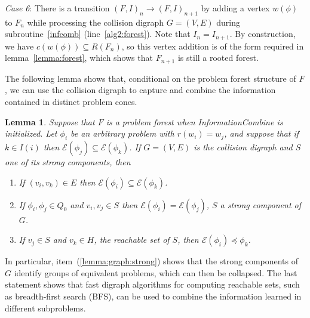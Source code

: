 \documentclass[11pt,reqno]{amsart}
\newtheorem{lemma}[thm]{Lemma}
\theoremstyle{definition}
\numberwithin{equation}{section}
\newcommand{\pre}{\phi}
\newcommand{\sub}{\subseteq}
\newcommand{\fix}{\mathcal{E}}
\newcommand{\peq}{\preceq}
\newcommand{\strongcomp}{S}
\newcommand{\acto}{Q_0}
\newcommand{\coll}{I}
\newcommand{\reach}{H}
\newcommand{\forest}{F}
\newcommand{\pair}{(F,I)}
\newcommand{\roott}{R}
\begin{document}
\begin{enumerate}
\emph{Case 6}: There is a transition $\pair_n \to \pair_{n + 1}$ by adding a vertex $w(\pre)$ to $\forest_n$ while processing the collision digraph $G = (V,E)$ during subroutine~\ref{infcomb} (line~\ref{alg2:forest}).
Note that $\coll_n = \coll_{n + 1}$. 
By construction, we have $c(w(\pre)) \sub \roott(\forest_n)$, so this vertex addition is of the form required in lemma~\ref{lemma:forest}, which shows that $\forest_{n + 1}$ is still a rooted forest.  

The following lemma shows that, conditional on the problem forest structure of $\forest$, we can use the collision digraph to capture and combine the information contained in distinct problem cones.
\begin{lemma} \label{lemma:graph}
Suppose that $\forest$ is a problem forest when InformationCombine is initialized. 
Let $\pre_i$ be an arbitrary problem with $r(w_i) = w_j$, and suppose that if $k \in \coll(i)$ then $\fix(\pre_j) \sub \fix(\pre_k)$. If $G = (V,E)$ is the collision digraph and $S$ one of its strong components, then 
\begin{enumerate}
\item If $(v_i, v_k) \in E$ then $\fix(\pre_i) \sub \fix(\pre_k)$. \label{lemma:graph:edge}
\item If $\pre_i, \pre_j \in \acto$ and $v_i, v_j \in \strongcomp$ then $\fix(\pre_i) = \fix(\pre_j)$, $\strongcomp$ a strong component of $G$. \label{lemma:graph:strong}
\item If $v_j \in \strongcomp$ and $v_k \in \reach$, the reachable set of $\strongcomp$, then $\fix(\pre_i) \peq \pre_k$. \label{lemma:graph:reach}
\end{enumerate}
\end{lemma}
In particular, item~(\ref{lemma:graph:strong}) shows that the strong components of $G$ identify groups of equivalent problems, which can then be collapsed. 
The last statement shows that fast digraph algorithms for computing reachable sets, such as breadth-first search (BFS), can be used to combine the information learned in different subproblems.


\end{enumerate}
\end{document}
